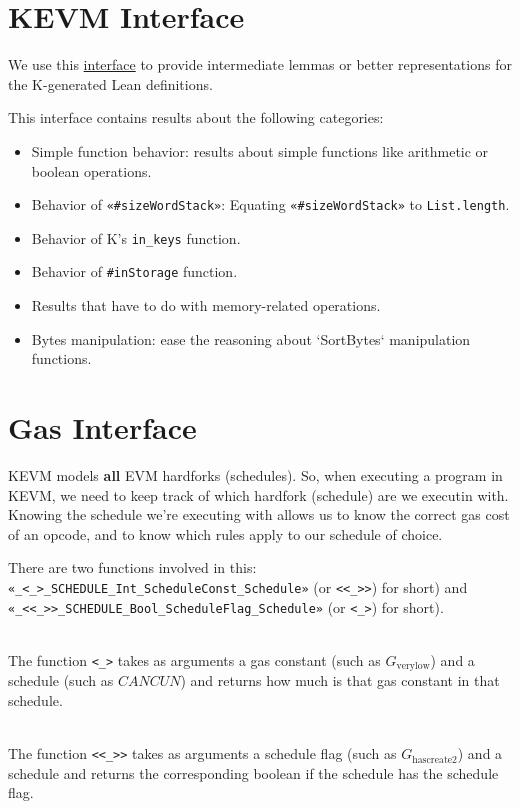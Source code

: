 \section{KEVM Interface}

We use this
\href{https://runtimeverification.github.io/evm-equivalence/docs/EvmEquivalence/Interfaces/FuncInterface.html}{interface}
to provide intermediate lemmas or better representations for the K-generated
Lean definitions.

This interface contains results about the following categories:
\begin{itemize}
\item Simple function behavior: results about simple functions like arithmetic
  or boolean operations.
\item Behavior of \texttt{«#sizeWordStack»}: Equating \texttt{«#sizeWordStack»}
  to \texttt{List.length}.
\item Behavior of K's \texttt{in_keys} function.
\item Behavior of \texttt{#inStorage} function.
\item Results that have to do with memory-related operations.
\item Bytes manipulation: ease the reasoning about `SortBytes` manipulation functions.
\end{itemize}

\section{Gas Interface}

KEVM models \textbf{all} EVM hardforks (schedules). So, when executing a program in KEVM, we
need to keep track of which hardfork (schedule) are we executin with.
Knowing the schedule we're executing with allows us to know the correct gas cost
of an opcode, and to know which rules apply to our schedule of choice.

There are two functions involved in this:
\texttt{«_<_>_SCHEDULE_Int_ScheduleConst_Schedule»} (or \texttt{<<_>>}) for
short) and
\texttt{«_<<_>>_SCHEDULE_Bool_ScheduleFlag_Schedule»} (or \texttt{<_>}) for
short).

\\
The function \texttt{<_>} takes as arguments a gas constant (such as
$G_{\text{verylow}}$) and a schedule (such as $CANCUN$) and returns how much is
that gas constant in that schedule.

\\
The function \texttt{<<_>>} takes as arguments a schedule flag (such as
$G_{\text{hascreate2}}$) and  a schedule and returns the corresponding boolean
if the schedule has the schedule flag.

